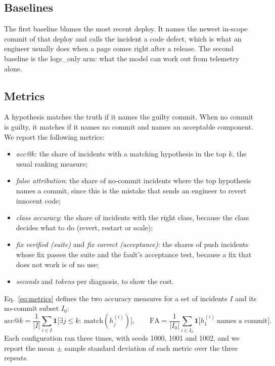\documentclass[12pt,onecolumn,draftclsnofoot]{IEEEtran}
\begin{document}
\subsection{Baselines}
The first baseline blames the most recent deploy. It names the newest in-scope commit of that deploy and calls the incident a code defect, which is what an engineer usually does when a page comes right after a release. The second baseline is the logs\_only arm: what the model can work out from telemetry alone.

\subsection{Metrics}
A hypothesis matches the truth if it names the guilty commit. When no commit is guilty, it matches if it names no commit and names an acceptable component. We report the following metrics:
\begin{itemize}
\item \emph{acc@$k$}: the share of incidents with a matching hypothesis in the top $k$, the usual ranking measure;
\item \emph{false attribution}: the share of no-commit incidents where the top hypothesis names a commit, since this is the mistake that sends an engineer to revert innocent code;
\item \emph{class accuracy}: the share of incidents with the right class, because the class decides what to do (revert, restart or scale);
\item \emph{fix verified (suite)} and \emph{fix correct (acceptance)}: the shares of push incidents whose fix passes the suite and the fault's acceptance test, because a fix that does not work is of no use;
\item \emph{seconds} and \emph{tokens} per diagnosis, to show the cost.
\end{itemize}
Eq.~\eqref{eq:metrics} defines the two accuracy measures for a set of incidents $I$ and its no-commit subset $I_0$:
\begin{equation}
\mathrm{acc@}k=\frac{1}{|I|}\sum_{i\in I}\mathbf{1}\bigl[\exists j\le k:\ \mathrm{match}(h^{(i)}_j)\bigr],\qquad
\mathrm{FA}=\frac{1}{|I_0|}\sum_{i\in I_0}\mathbf{1}\bigl[h^{(i)}_1\ \text{names a commit}\bigr].
\label{eq:metrics}
\end{equation}
Each configuration ran three times, with seeds 1000, 1001 and 1002, and we report the mean $\pm$ sample standard deviation of each metric over the three repeats.
\end{document}

